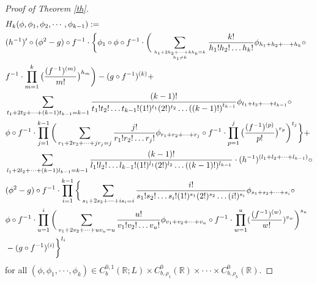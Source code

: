 \documentclass[11pt,reqno,a4paper]{amsart}
\numberwithin{equation}{section}
\begin{document}
\begin{proof}[Proof of Theorem \ref{th}]
\begin{equation}\label{H_k}
   \begin{aligned}
 &H_k (\phi,\phi_1,\phi_2,\cdots,\phi_{k-1}) := \\
 &(h^{-1})'\circ (\phi^{2} -g)\circ f^{-1} \cdot \bigg\{ \phi_1 \circ \phi  \circ f^{-1} \cdot \bigg( \sum_{h_1+2h_2+\dots+kh_k=k \atop h_1 \neq k} \frac{k!}{h_1!h_2!\dots h_k!} \phi_{h_1+h_2+\dots +h_k} \circ \\
 &f^{-1} \cdot\prod_{m=1}^k\big(\frac{( f^{-1} )^{(m)}}{m!}\big)^{h_m} \bigg)  -(g\circ f^{-1})^{(k)}  + \\
 &\sum_{t_1+2t_2+\dots+(k-1)t_{k-1}=k-1 }\frac{(k-1)!}{t_1!t_2!\dots t_{k-1}!(1!)^{t_1}(2!)^{t_2}\dots{((k-1)!)}^{t_{k-1}}} \phi_{t_1+t_2+\dots +t_{k-1}}\circ \\
 &\phi \circ f^{-1} \cdot
  \prod_{j=1}^{k-1}\bigg(   \sum_{r_1+2r_2+\dots+jr_j=j }\frac{j!}{r_1!r_2!\dots r_j!} \phi_{r_1+r_2+\dots +r_j} \circ f^{-1} \cdot \prod_{p=1}^j\big(\frac{ ( f^{-1} )^{(p)}}{p!}\big)^{r_p}       \bigg)^{t_j} \bigg\}   +  \\
&\sum_{l_1+2l_2+\dots+(k-1)l_{k-1}=k-1 }\frac{(k-1)!}{l_1!l_2!\dots l_{k-1}!(1!)^{l_1}(2!)^{l_2}\dots((k-1)!)^{l_{k-1}}} \cdot (h^{-1})^{(l_1+l_2+\dots +l_{k-1})}\circ\\
&(\phi^{2} - g)\circ f^{-1} \cdot 
  \prod_{i=1}^{k-1}\bigg\{   \sum_{s_1+2s_2+\dots+is_i=i }\frac{i!}{s_1!s_2!\dots s_i!(1!)^{s_1}(2!)^{s_2}\dots (i!)^{s_i}} \phi_{s_1+s_2+\dots +s_i} \circ \\
  &\phi \circ f^{-1} \cdot  \prod_{u=1}^i\bigg(  \sum_{v_1+2v_2+\dots+uv_u=u }\frac{u!}{v_1!v_2!\dots v_u!} \phi_{v_1+v_2+\dots +v_u} \circ f^{-1} \cdot \prod_{w=1}^u(\frac{(f^{-1})^{(w)}}{w!})^{v_w}    \bigg)^{s_u} \\
  &-(g\circ f^{-1})^{(i)}\bigg\}^{l_i}   
   \end{aligned}
\end{equation}
for all $(\phi,\phi_1,\cdot\cdot \cdot,\phi_k) \in C_{b}^{0,1}(\mathbb{R};L)\times  C_{b,\rho_1}^0(\mathbb{R})\times\cdot\cdot \cdot\times C_{b,\rho_k}^0(\mathbb{R}).$


\end{proof}
\end{document}
